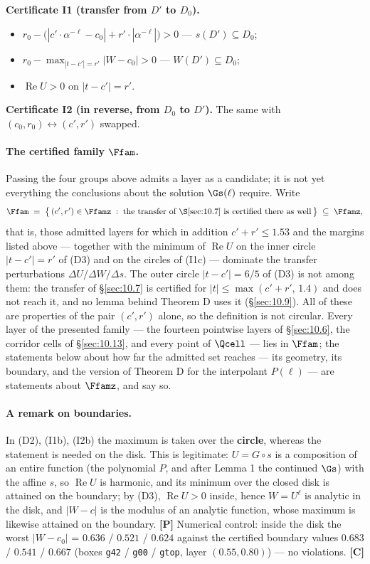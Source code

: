 \textbf{Certificate I1 (transfer from $D'$ to $D_0$).}

\begin{itemize}
\item[(I1a)] $r_0 - \big( |c'\cdot\alpha^{-\ell} - c_0| + r'\cdot|\alpha^{-\ell}| \big) > 0$ --- $s(D')\subseteq D_0$;
\item[(I1b)] $r_0 - \max_{|t-c'|=r'} |W - c_0| > 0$ --- $W(D')\subseteq D_0$;
\item[(I1c)] $\operatorname{Re} U > 0$ on $|t - c'| = r'$.
\end{itemize}

\textbf{Certificate I2 (in reverse, from $D_0$ to $D'$).} The same with
$(c_0,r_0) \leftrightarrow (c',r')$ swapped.

\paragraph{The certified family $\Ffam$.} Passing the four groups above admits a
layer as a candidate; it is not yet everything the conclusions about the
solution $\Gs(\ell)$ require. Write
\[
  \Ffam \;=\; \bigl\{\,(c',r')\in\Ffamz \;:\;
     \text{the transfer of \S\ref{sec:10.7} is certified there as well}\,\bigr\}
  \;\subseteq\; \Ffamz ,
\]
that is, those admitted layers for which in addition $c'+r' \le 1.53$ and the
margins listed above --- together with the minimum of $\operatorname{Re} U$ on the
inner circle $|t-c'| = r'$ of (D3) and on the circles of (I1c) --- dominate the
transfer perturbations
$\Delta U/\Delta W/\Delta s$. The outer circle $|t-c'| = 6/5$ of (D3) is not
among them: the transfer of \S\ref{sec:10.7} is certified for
$|t| \le \max(c'+r',\,1.4)$ and does not reach it, and no lemma behind
Theorem D uses it (\S\ref{sec:10.9}). All of these are properties of the pair
$(c',r')$ alone, so the definition is not circular.
Every layer of the presented family --- the fourteen pointwise layers of
\S\ref{sec:10.6}, the corridor cells of \S\ref{sec:10.13}, and every point of $\Qcell$ --- lies in
$\Ffam$; the statements below about how far the admitted set reaches --- its
geometry, its boundary, and the version of Theorem D for the interpolant
$P(\ell)$ --- are statements about $\Ffamz$, and say so.

\paragraph{A remark on boundaries.} In (D2), (I1b), (I2b) the maximum is taken
over the \textbf{circle}, whereas the statement is needed on the disk.
This is legitimate: $U = G\circ s$ is a composition of an entire function
(the polynomial $P$, and after Lemma 1 the continued $\Gs$) with the
affine $s$, so $\operatorname{Re} U$ is harmonic, and its minimum over the closed
disk is attained on the boundary; by (D3), $\operatorname{Re} U > 0$ inside, hence
$W = U^\ell$ is analytic in the disk, and $|W - c|$ is the modulus of an
analytic function, whose maximum is likewise attained on the
boundary. \textbf{[P]} Numerical control: inside the disk the worst
$|W - c_0|$ = $0.636$ / $0.521$ / $0.624$ against the certified boundary
values $0.683$ / $0.541$ / $0.667$ (boxes \texttt{g42} / \texttt{g00} / \texttt{gtop}, layer
$(0.55, 0.80)$) --- no violations. \textbf{[C]}

